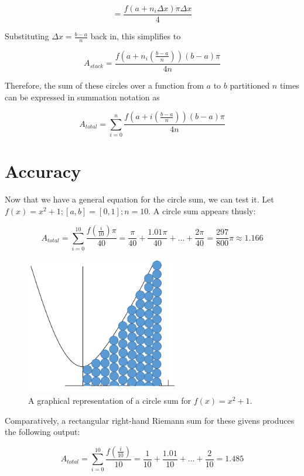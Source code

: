 \documentclass[12pt]{article}
\begin{document}
        \[ = \frac{f(a+n_i\Delta x)\pi\Delta x}{4} \]

        Substituting \( \Delta x = \frac{b-a}{n} \) back in, this simplifies to

        \[ A_{stack} = \frac{f(a+n_i(\frac{b-a}{n}))(b-a)\pi}{4n} \]

        Therefore, the sum of these circles over a function from \( a \) to \( b \) partitioned \( n \) times can be expressed in summation notation as

        \[ A_{total} = \displaystyle \sum_{i=0}^n \frac{f(a+i(\frac{b-a}{n}))(b-a)\pi}{4n} \]

  \section{Accuracy}
    Now that we have a general equation for the circle sum, we can test it. Let \( f(x) = x^2 + 1; [a,b] = [0,1]; n = 10 \). A circle sum appears thusly:

    \[ A_{total} = \displaystyle \sum_{i=0}^{10} \frac{f(\frac{i}{10})\pi}{40} = \frac{\pi}{40} + \frac{1.01\pi}{40} + \dots + \frac{2\pi}{40} = \frac{297}{800}\pi \approx 1.166 \]

    \begin{figure}[h]
      \centering
      \includegraphics[width=0.6\textwidth]{circle_deriv_1}
      \caption{A graphical representation of a circle sum for \( f(x) = x^2 + 1 \).}
    \end{figure}

    Comparatively, a rectangular right-hand Riemann sum for these givens produces the following output:

    \[ A_{total} = \displaystyle \sum_{i=0}^{10} \frac{f(\frac{i}{10})}{10} = \frac{1}{10} + \frac{1.01}{10} + \dots + \frac{2}{10} = 1.485 \]
\end{document}
